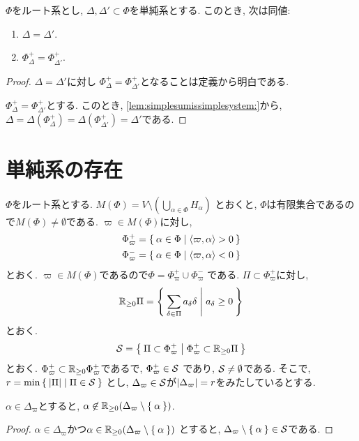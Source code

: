 \begin{theorem}
  $\Phi$をルート系とし,
  $\Delta,\Delta'\subset \Phi$を単純系とする.
  このとき, 次は同値:
  \begin{enumerate}
  \item $\Delta=\Delta'$.
  \item $\Phi_\Delta^+=\Phi_{\Delta'}^+$.
  \end{enumerate}
\end{theorem}
\begin{proof}
  $\Delta=\Delta'$に対し
  $\Phi_\Delta^+=\Phi_{\Delta'}^+$となることは定義から明白である.

  $\Phi_\Delta^+=\Phi_{\Delta'}^+$とする.
  このとき,
  \cref{lem:simplesumissimplesystem:}から,
  $\Delta=\Delta(\Phi_\Delta^+)=\Delta(\Phi_{\Delta'}^+)=\Delta'$である.

\end{proof}

\section{単純系の存在}
$\Phi$をルート系とする.
$M(\Phi)=V \setminus (\bigcup_{\alpha\in\Phi}H_\alpha)$
とおくと,
$\Phi$は有限集合であるので$M(\Phi)\neq \emptyset$である.
$\varpi\in M(\Phi)$に対し,
\begin{align*}
  \Phi_{\varpi}^+&=\Set{\alpha\in\Phi|\Braket{\varpi,\alpha}>0}\\
  \Phi_{\varpi}^-&=\Set{\alpha\in\Phi|\Braket{\varpi,\alpha}<0}
\end{align*}
とおく.
$\varpi\in M(\Phi)$であるので$\Phi=\Phi_{\varpi}^+\cup \Phi_{\varpi}^-$
である.
$\Pi\subset \Phi_{\varpi}^+$に対し,
\begin{align*}
  \mathbb{R}_{\geq 0}\Pi =
  \Set{\sum_{\delta\in\Pi}a_\delta \delta|a_\delta \geq 0}
\end{align*}
とおく.
\begin{align*}
  \mathcal{S} =
  \Set{\Pi\subset \Phi_{\varpi}^+|\Phi_{\varpi}^+\subset \mathbb{R}_{\geq 0}\Pi}
\end{align*}
とおく.
$\Phi_{\varpi}^+\subset \mathbb{R}_{\geq 0}\Phi_{\varpi}^+$であるで,
$\Phi_{\varpi}^+\in\mathcal{S}$
であり, $\mathcal{S}\neq\emptyset$である.
そこで, $r=\min\Set{\left|\Pi\right||\Pi\in\mathcal{S}}$
とし, $\Delta_{\varpi}\in\mathcal{S}$が$\left|\Delta_{\varpi}\right|=r$をみたしているとする.
\begin{lemma}
  \label{lem:simple:posiindp}
  $\alpha\in \Delta_{\varpi}$とすると,
  $\alpha\not\in\mathbb{R}_{\geq 0}(\Delta_{\varpi}\setminus\Set{\alpha})$.
\end{lemma}
\begin{proof}
  $\alpha\in \Delta_{\varpi}$かつ$\alpha\in\mathbb{R}_{\geq 0}(\Delta_{\varpi}\setminus\Set{\alpha})$
  とすると, $\Delta_{\varpi}\setminus\Set{\alpha}\in\mathcal{S}$である.
\end{proof}

